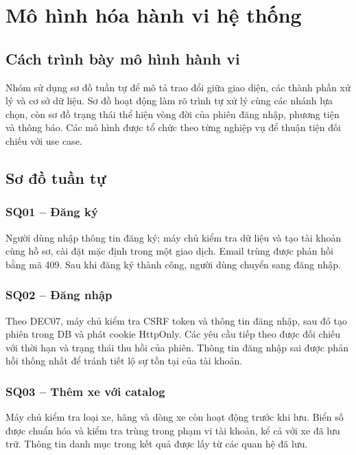 \chapter{Mô hình hóa hành vi hệ thống}\label{chap:behavior}
\section{Cách trình bày mô hình hành vi}
Nhóm sử dụng sơ đồ tuần tự để mô tả trao đổi giữa giao diện, các thành phần xử lý và cơ sở dữ liệu. Sơ đồ hoạt động làm rõ trình tự xử lý cùng các nhánh lựa chọn, còn sơ đồ trạng thái thể hiện vòng đời của phiên đăng nhập, phương tiện và thông báo. Các mô hình được tổ chức theo từng nghiệp vụ để thuận tiện đối chiếu với use case.

\section{Sơ đồ tuần tự}
\subsection{SQ01 -- Đăng ký}
Người dùng nhập thông tin đăng ký; máy chủ kiểm tra dữ liệu và tạo tài khoản cùng hồ sơ, cài đặt mặc định trong một giao dịch. Email trùng được phản hồi bằng mã 409. Sau khi đăng ký thành công, người dùng chuyển sang đăng nhập.

\subsection{SQ02 -- Đăng nhập}
Theo DEC07, máy chủ kiểm tra CSRF token và thông tin đăng nhập, sau đó tạo phiên trong DB và phát cookie HttpOnly. Các yêu cầu tiếp theo được đối chiếu với thời hạn và trạng thái thu hồi của phiên. Thông tin đăng nhập sai được phản hồi thống nhất để tránh tiết lộ sự tồn tại của tài khoản.

\subsection{SQ03 -- Thêm xe với catalog}
Máy chủ kiểm tra loại xe, hãng và dòng xe còn hoạt động trước khi lưu. Biển số được chuẩn hóa và kiểm tra trùng trong phạm vi tài khoản, kể cả với xe đã lưu trữ. Thông tin danh mục trong kết quả được lấy từ các quan hệ đã lưu.

